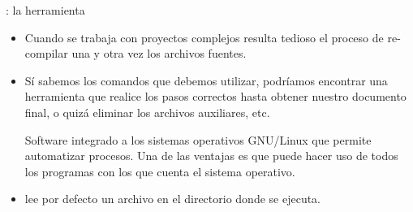 \documentclass[draft]{beamer}
\begin{document}
\begin{frame}[fragile]{\insertsection: la herramienta }
  \begin{itemize}
  \item Cuando se trabaja con proyectos complejos resulta tedioso el
    proceso de re-compilar una y otra vez los archivos fuentes.
  \item Sí sabemos los comandos que debemos utilizar, podríamos
    encontrar una herramienta que realice los pasos correctos hasta
    obtener nuestro documento final, o quizá eliminar los archivos
    auxiliares, etc.
    
    \begin{block}{}
      {\scriptsize Software integrado a los sistemas operativos
      GNU/Linux que permite automatizar procesos. Una de las ventajas
      es que puede hacer uso de todos los programas con los que cuenta
      el sistema operativo.}
    \end{block}

  \item {} lee por defecto un archivo  en el
    directorio donde se ejecuta. 
  \end{itemize}
\end{frame}
\end{document}
